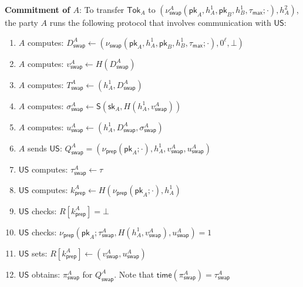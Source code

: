 \documentclass{article}
\newcommand{\sig}[0]{\mathsf{S}}
\newcommand{\pubkey}[0]{\mathsf{pk}}
\newcommand{\prikey}[0]{\mathsf{sk}}
\newcommand{\unisrv}[0]{\mathsf{US}}
\begin{document}
\noindent\textbf{Commitment of $A$}: To transfer $\mathsf{Tok}_A$ to $(\nu^A_\mathsf{swap}(\pubkey_A,h^1_A,\pubkey_B,h^1_B,\tau_\mathsf{max};\cdot),h^2_A)$, the party $A$ runs the following protocol that involves communication with $\unisrv$:
\begin{enumerate}
    \item $A$ computes: $D^A_\mathsf{swap}\gets (\nu_\mathsf{swap}(\pubkey_A,h^1_A,\pubkey_B,h^1_B,\tau_\mathsf{max};\cdot), 0^\ell,\bot)$
    \item $A$ computes: $v^A_\mathsf{swap}\gets H(D^A_\mathsf{swap})$
    \item $A$ computes: $T^A_\mathsf{swap}\gets (h^1_A, D^A_\mathsf{swap})$
    \item $A$ computes: $\sigma^A_\mathsf{swap}\gets \sig(\prikey_A,H(h^1_A,v^A_\mathsf{swap}))$
    \item $A$ computes: $u^A_\mathsf{swap}\gets (h^1_A,D^A_\mathsf{swap},\sigma^A_\mathsf{swap})$
    \item $A$ sends $\unisrv$: $Q^A_\mathsf{swap}=(\nu_\mathsf{prep}(\pubkey_A;\cdot),h^1_A,v^A_\mathsf{swap},u^A_\mathsf{swap})$
    \item $\unisrv$ computes: $\tau^A_\mathsf{swap}\gets \tau$
    \item $\unisrv$ computes: $k^A_\mathsf{prep}\gets H(\nu_\mathsf{prep}(\pubkey_A;\cdot),h^1_A)$
    \item $\unisrv$ checks: $R[k^A_\mathsf{prep}]=\bot$
    \item $\unisrv$ checks: $\nu_\mathsf{prep}(\pubkey_A;\tau^A_\mathsf{swap},H(h^1_A,v^A_\mathsf{swap}),u^A_\mathsf{swap})=1$
    \item $\unisrv$ sets: $R[k^A_\mathsf{prep}]\gets (v^A_\mathsf{swap},u^A_\mathsf{swap})$
    \item $\unisrv$ obtains: $\pi^A_\mathsf{swap}$ for $Q^A_\mathsf{swap}$. Note that $\mathsf{time}(\pi^A_\mathsf{swap})=\tau^A_\mathsf{swap}$


\end{enumerate}
\end{document}

